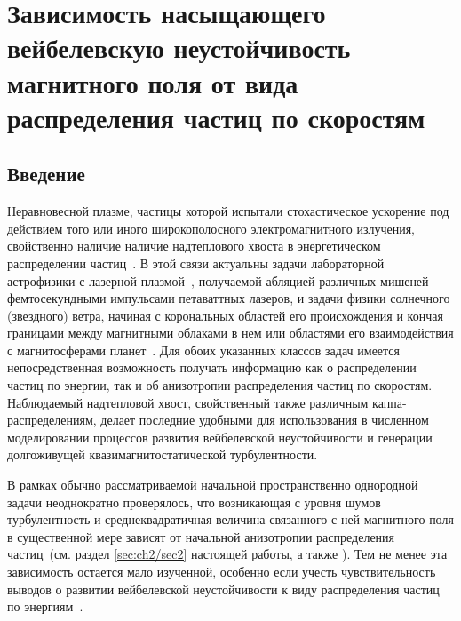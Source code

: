 \chapter{Зависимость насыщающего вейбелевскую неустойчивость магнитного поля от вида распределения частиц по скоростям}
\newcommand{\PunctumKappa}{-}
\label{ch:ch5}
\section{Введение}\label{ch:ch5/sec1}
Неравновесной плазме, частицы которой испытали стохастическое ускорение под действием того или иного широкополосного электромагнитного излучения, свойственно наличие наличие надтеплового {\glqq}хвоста{\grqq} в энергетическом распределении частиц~\cite{Maksimovic2005, Vasyliunas1968,Lazar2022}.
В этой связи актуальны задачи лабораторной астрофизики с лазерной плазмой~\cite{Romanov2004, Thaury2010, Silva2020, Shukla2020, Zhang2020}, получаемой абляцией различных мишеней фемтосекундными импульсами петаваттных лазеров, и задачи физики солнечного (звездного) ветра, начиная с корональных областей его происхождения и кончая границами между магнитными облаками в нем или областями его взаимодействия с магнитосферами планет~\cite{Baumjohann2012, Dudik2017, Livadiotis2017,Marsch2006,Yoon2017,Echim2010}.
Для обоих указанных классов задач имеется непосредственная возможность получать информацию как о распределении частиц по энергии, так и об анизотропии распределения частиц по скоростям. 
Наблюдаемый надтепловой {\glqq}хвост{\grqq}, свойственный также различным каппа{\PunctumKappa}распределениям, делает последние удобными для использования в численном моделировании процессов развития вейбелевской неустойчивости и генерации долгоживущей квазимагнитостатической турбулентности. 

В рамках обычно рассматриваемой начальной пространственно однородной задачи неоднократно проверялось, что возникающая с уровня шумов турбулентность и среднеквадратичная величина связанного с ней магнитного поля в существенной мере зависят от начальной анизотропии распределения частиц~(см. раздел \ref{sec:ch2/sec2} настоящей работы, а также \cite{Lemons1979, Kato2005, Borodachev2010,Davidson1972,Ruyer2015,Lazar2022}).
Тем не менее эта зависимость остается мало изученной, особенно если учесть чувствительность выводов о развитии вейбелевской неустойчивости к виду распределения частиц по энергиям~\cite{Lazar2010,Silva2021}. 

